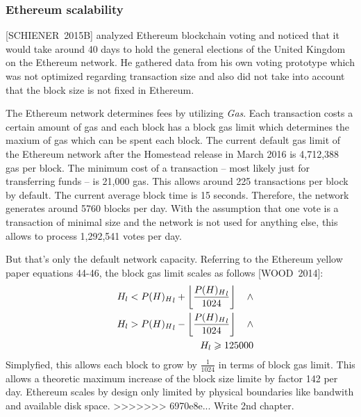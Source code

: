 \documentclass[9pt,oneside]{amsart}
\begin{document}
\begin{multicols}{2}
\subsubsection{Ethereum scalability}
[SCHIENER~2015B] analyzed Ethereum blockchain voting and noticed that it would take around 40 days to hold the general elections of the United Kingdom on the Ethereum network. He gathered data from his own voting prototype which was not optimized regarding transaction size and also did not take into account that the block size is not fixed in Ethereum.\par
The Ethereum network determines fees by utilizing \textit{Gas}. Each transaction costs a certain amount of gas and each block has a block gas limit which determines the maxium of gas which can be spent each block. The current default gas limit of the Ethereum network after the Homestead release in March 2016 is 4,712,388 gas per block. The minimum cost of a transaction -- most likely just for transferring funds -- is 21,000 gas. This allows around 225 transactions per block by default. The current average block time is 15 seconds. Therefore, the network generates around 5760 blocks per day. With the assumption that one vote is a transaction of minimal size and the network is not used for anything else, this allows to process 1,292,541 votes per day.\par
But that's only the default network capacity. Referring to the Ethereum yellow paper equations 44-46, the block gas limit scales as follows [WOOD~2014]:
\begin{eqnarray} \addtocounter{equation}{43}
& & H_l < {P(H)_H}_l + \left\lfloor\frac{{P(H)_H}_l}{1024}\right\rfloor \quad \wedge \\
& & H_l > {P(H)_H}_l - \left\lfloor\frac{{P(H)_H}_l}{1024}\right\rfloor \quad \wedge \\
& & H_l \geqslant 125000
\end{eqnarray}
Simplyfied, this allows each block to grow by $\frac{1}{1024}$ in terms of block gas limit. This allows a theoretic maximum increase of the block size limite by factor 142 per day. Ethereum scales by design only limited by physical boundaries like bandwith and available disk space.
>>>>>>> 6970e8e... Write 2nd chapter.


\end{multicols}
\end{document}
